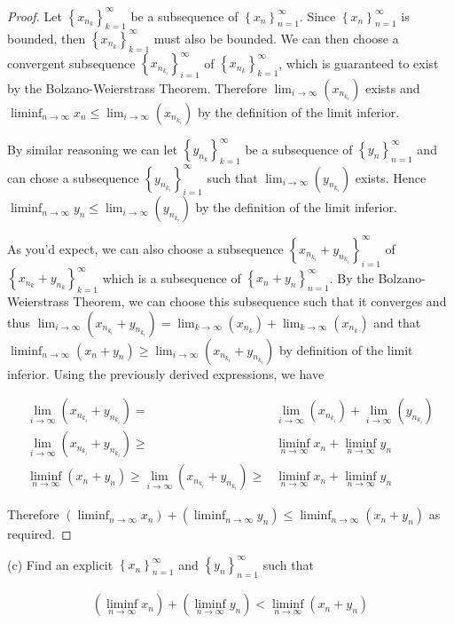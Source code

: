 \documentclass[12pt]{article}
\newcommand{\limtoinf}[1][n]{\lim_{ {#1} \to \infty}}
\newcommand{\liminftoinf}[1][n]{\liminf_{ {#1} \to \infty}}
\newcommand{\seq}[2][n]{\left\{ {#2} \right\}_{#1=1}^\infty}
\newcommand{\paren}[1]{\left( {#1} \right)}
\begin{document}
\begin{proof}
	Let $\seq[k]{x_{n_k}}$ be a subsequence of $\seq{x_n}$. Since $\seq{x_n}$ is bounded, then $\seq[k]{x_{n_k}}$ must also be bounded. We can then choose a convergent subsequence $\seq[i]{x_{n_{k_i}}}$ of $\seq[k]{x_{n_k}}$, which is guaranteed to exist by the Bolzano-Weierstrass Theorem. Therefore $\limtoinf[i] \paren{x_{n_{k_i}}}$ exists and $\liminftoinf x_n\le\limtoinf[i] \paren{x_{n_{k_i}}}$ by the definition of the limit inferior.
	
\indent By similar reasoning we can let $\seq[k]{y_{n_k}}$ be a subsequence of $\seq{y_n}$ and can chose a subsequence $\seq[i]{y_{n_{k_i}}}$ such that $\limtoinf[i] \paren{y_{n_{k_i}}}$ exists. Hence $\liminftoinf y_n\le\limtoinf[i] \paren{y_{n_{k_i}}}$ by the definition of the limit inferior.

\indent As you'd expect, we can also choose a subsequence $\seq[i]{x_{n_{k_i}}+y_{n_{k_i}}}$ of $\seq[k]{x_{n_{k}}+y_{n_{k}}}$ which is a subsequence of $\seq{x_n+y_n}$. By the Bolzano-Weierstrass Theorem, we can choose this subsequence such that it converges and thus $\limtoinf[i]\paren{x_{n_{k_i}}+y_{n_{k_i}}}=\limtoinf[k]\paren{x_{n_k}}+\limtoinf[k]\paren{x_{n_k}}$ and that $\liminftoinf\paren{x_n+y_n}\ge\limtoinf[i]\paren{x_{n_{k_i}}+y_{n_{k_i}}}$ by definition of the limit inferior. Using the previously derived expressions, we have

\begin{align*}
	\limtoinf[i]\paren{x_{n_{k_i}}+y_{n_{k_i}}}=&\limtoinf[i]\paren{x_{n_{k_i}}} + \limtoinf[i]\paren{y_{n_{k_i}}} \\
	\limtoinf[i]\paren{x_{n_{k_i}}+y_{n_{k_i}}}\ge&\liminftoinf x_n +\liminftoinf y_n \\
	\liminftoinf\paren{x_n+y_n}\ge\limtoinf[i]\paren{x_{n_{k_i}}+y_{n_{k_i}}}\ge&\liminftoinf x_n +\liminftoinf y_n
\end{align*}

\noindent Therefore $\paren{\liminftoinf x_n}+\paren{\liminftoinf y_n}\le\liminftoinf\paren{x_n+y_n}$ as required.

\end{proof}

\newpage

(c) Find an explicit $\seq{x_n}$ and $\seq{y_n}$ such that

\begin{align*}
	\paren{\liminftoinf x_n}+\paren{\liminftoinf y_n}<\liminftoinf\paren{x_n+y_n}
\end{align*}
\end{document}
